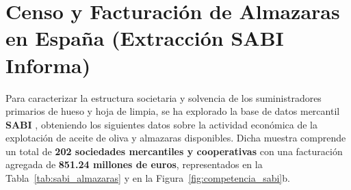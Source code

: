 \documentclass{report}
\begin{document}
\begin{table}[H]
    \centering
    \caption{Distribución provincial de potencia térmica de biomasa por sectores en Andalucía a 30 de junio de 2026. Fuente: Elaboración propia a partir de datos oficiales de la Agencia Andaluza de la Energía \autocite[Sección~6.2, pág.~18]{AAE2026}.}
    \label{tab:potencia_termica_miea}
\end{table}

\section{Censo y Facturación de Almazaras en España (Extracción SABI Informa)}
Para caracterizar la estructura societaria y solvencia de los suministradores primarios de hueso y hoja de limpia, se ha explorado la base de datos mercantil \textbf{SABI} \autocite{SABI2026}, obteniendo los siguientes datos sobre la actividad económica de la explotación de aceite de oliva y almazaras disponibles. Dicha muestra comprende un total de \textbf{\num{202} sociedades mercantiles y cooperativas} con una facturación agregada de \textbf{\num{851.24} millones de euros}, representados en la Tabla~\ref{tab:sabi_almazaras} y en la Figura~\ref{fig:competencia_sabi}b.
\end{document}
